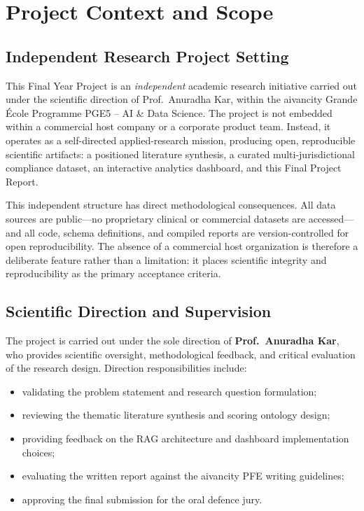 \chapter{Project Context and Scope}
\label{ch:context}

\section{Independent Research Project Setting}
\label{sec:setting}

This Final Year Project is an \emph{independent} academic research initiative carried
out under the scientific direction of Prof.\ Anuradha Kar, within the aivancity
Grande \'Ecole Programme PGE5 -- AI \& Data Science. The project is not embedded
within a commercial host company or a corporate product team. Instead, it operates as
a self-directed applied-research mission, producing open, reproducible scientific
artifacts: a positioned literature synthesis, a curated multi-jurisdictional compliance
dataset, an interactive analytics dashboard, and this Final Project Report.

This independent structure has direct methodological consequences. All data sources are
public---no proprietary clinical or commercial datasets are accessed---and all code,
schema definitions, and compiled reports are version-controlled for open reproducibility.
The absence of a commercial host organization is therefore a deliberate feature rather
than a limitation: it places scientific integrity and reproducibility as the primary
acceptance criteria.

\section{Scientific Direction and Supervision}
\label{sec:supervision}

The project is carried out under the sole direction of \textbf{Prof.\ Anuradha Kar},
who provides scientific oversight, methodological feedback, and critical evaluation of
the research design. Direction responsibilities include:

\begin{itemize}[noitemsep]
  \item validating the problem statement and research question formulation;
  \item reviewing the thematic literature synthesis and scoring ontology design;
  \item providing feedback on the RAG architecture and dashboard implementation
        choices;
  \item evaluating the written report against the aivancity PFE writing guidelines;
  \item approving the final submission for the oral defence jury.
\end{itemize}

